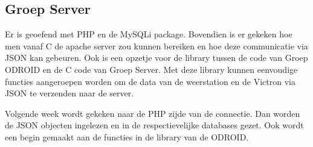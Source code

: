 \subsection*{Groep Server}
Er is geoefend met PHP en de MySQLi package. Bovendien is er gekeken hoe men vanaf C de apache server zou kunnen bereiken en hoe deze communicatie via JSON kan gebeuren. Ook is een opzetje voor de library tussen de code van Groep ODROID en de C code van Groep Server. Met deze library kunnen eenvoudige functies aangeroepen worden om de data van de weerstation en de Victron via JSON te verzenden naar de server.

Volgende week wordt gekeken naar de PHP zijde van de connectie. Dan worden de JSON objecten ingelezen en in de respectievelijke databases gezet. Ook wordt een begin gemaakt aan de functies in de library van de ODROID.

